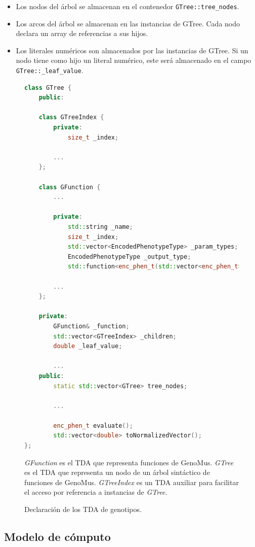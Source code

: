 \begin{itemize}
    \item Los nodos del árbol se almacenan en el contenedor \verb|GTree::tree_nodes|.
    \item Los arcos del árbol se almacenan en las instancias de GTree. Cada nodo declara un array de referencias a sus hijos.
    \item Los literales numéricos son almacenados por las instancias de GTree. Si un nodo tiene como hijo un literal numérico, este será almacenado en el campo \verb|GTree::_leaf_value|.
\end{itemize}

\begin{figure}
    \centering
    \begin{lstlisting}[language=cpp]
class GTree {
    public:

    class GTreeIndex {
        private:
            size_t _index;
            
        ...
    };

    class GFunction {
        ...
        
        private:
            std::string _name;
            size_t _index;
            std::vector<EncodedPhenotypeType> _param_types;
            EncodedPhenotypeType _output_type;
            std::function<enc_phen_t(std::vector<enc_phen_t>)> _compute;
            
        ...
    };
    
    private:
        GFunction& _function;
        std::vector<GTreeIndex> _children;
        double _leaf_value;
        
        ...
    public:
        static std::vector<GTree> tree_nodes;
        
        ...

        enc_phen_t evaluate();
        std::vector<double> toNormalizedVector();
};
    \end{lstlisting}
    \caption{Declaración de los TDA de genotipos.} \textit{GFunction} es el TDA que representa funciones de GenoMus. \textit{GTree} es el TDA que representa un nodo de un árbol sintáctico de funciones de GenoMus. \textit{GTreeIndex} es un TDA auxiliar para facilitar el acceso por referencia a instancias de \textit{GTree}.
    \label{fig:dec_gen_hpp}
\end{figure}

\subsection{Modelo de cómputo}\label{ssec:modelo_computo}

